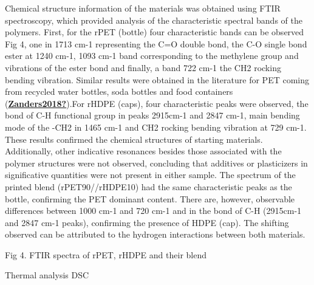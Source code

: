 \documentclass[
  12pt,
  number,
  review]{elsarticle}
\begin{document}
Chemical structure information of the materials was obtained using FTIR
spectroscopy, which provided analysis of the characteristic spectral
bands of the polymers. First, for the rPET (bottle) four characteristic
bands can be observed Fig 4, one in 1713 cm-1 representing the C=O
double bond, the C-O single bond ester at 1240 cm-1, 1093 cm-1 band
corresponding to the methylene group and vibrations of the ester bond
and finally, a band 722 cm-1 the CH2 rocking bending vibration. Similar
results were obtained in the literature for PET coming from recycled
water bottles, soda bottles and food containers
(\protect\hyperlink{ref-Zanders2018}{\textbf{Zanders2018?}}).For rHDPE
(caps), four characteristic peaks were observed, the bond of C-H
functional group in peaks 2915cm-1 and 2847 cm-1, main bending mode of
the -CH2 in 1465 cm-1 and CH2 rocking bending vibration at 729 cm-1.
These results confirmed the chemical structures of starting materials.
Additionally, other indicative resonances besides those associated with
the polymer structures were not observed, concluding that additives or
plasticizers in significative quantities were not present in either
sample. The spectrum of the printed blend (rPET90//rHDPE10) had the same
characteristic peaks as the bottle, confirming the PET dominant content.
There are, however, observable differences between 1000 cm-1 and 720
cm-1 and in the bond of C-H (2915cm-1 and 2847 cm-1 peaks), confirming
the presence of HDPE (cap). The shifting observed can be attributed to
the hydrogen interactions between both materials.

Fig 4. FTIR spectra of rPET, rHDPE and their blend

Thermal analysis DSC
\end{document}
